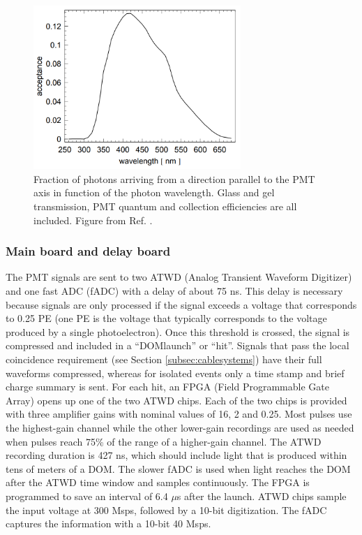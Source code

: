 \begin{figure}[ht]
\centering
\includegraphics[width=0.7\textwidth]{chapter5/img/acceptanceDOM.png}
\caption{Fraction of photons arriving from a direction parallel to the PMT axis in function of the photon wavelength. Glass and gel transmission, PMT quantum and collection efficiencies are all included. Figure from Ref. \cite{Aartsen:2013rt}.}
\label{fig:acceptance}
\end{figure}


\subsubsection{Main board and delay board}
\label{subsec:mainboard}
The PMT signals are sent to two ATWD (Analog Transient Waveform Digitizer) and one fast ADC (fADC) with a delay of about 75 ns. This delay is necessary because signals are only processed if the signal exceeds a voltage that corresponds to 0.25 PE (one PE is the voltage that typically corresponds to the voltage produced by a single photoelectron). Once this threshold is crossed, the signal is compressed and included in a ``DOMlaunch'' or ``hit''. Signals that pass the local coincidence requirement (see Section \ref{subsec:cablesystems}) have their full waveforms compressed, whereas for isolated events only a time stamp and brief charge summary is sent. For each hit, an FPGA  (Field Programmable Gate Array) opens up one of the two ATWD chips. Each of the two chips is provided with three amplifier gains with nominal values of 16, 2 and 0.25. Most pulses use the highest-gain channel while the other lower-gain recordings are used as needed when pulses reach 75\% of the range of a higher-gain channel. The ATWD recording duration is 427 ns, which should include light that is produced within tens of meters of a DOM. The slower fADC is used when light reaches the DOM after the ATWD time window and samples continuously. The FPGA is programmed to save an interval of 6.4 $\mu$s after the launch. ATWD chips sample the input voltage at 300 Msps, followed by a 10-bit digitization. The fADC captures the information with a 10-bit 40 Msps.

